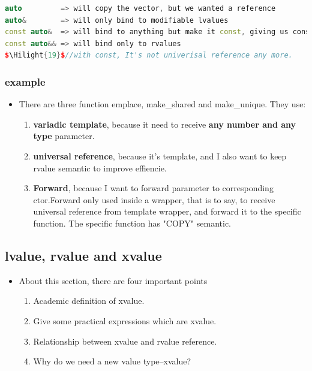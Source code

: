 \documentclass[a4paper,12pt,twoside]{book}
\newcommand{\Hilight}[1]{\makebox[0pt][l]{\color{yellow}\rule[-3pt]{#1em}{11pt}}}
\begin{document}
\begin{itemize}
\begin{enumerate}
\begin{lstlisting}[frame=single, language=c++]
auto         => will copy the vector, but we wanted a reference
auto&        => will only bind to modifiable lvalues
const auto&  => will bind to anything but make it const, giving us const_iterator
const auto&& => will bind only to rvalues
$\Hilight{19}$//with const, It's not univerisal reference any more.
\end{lstlisting} 
		\end{enumerate}

\end{itemize}

\subsubsection{example }
\begin{itemize}
\item There are three function emplace, make\_shared and make\_unique. They use:
		\begin{enumerate}
				\item \textbf{variadic template}, because it need to receive \textbf{any number and any type} parameter.
				
				\item \textbf{universal reference}, because it's template, and I also want to keep rvalue semantic to improve effiencie. 
				
				\item \textbf{Forward}, because I want to forward parameter to corresponding ctor.Forward only used inside a wrapper, that is to say, to receive universal reference from template wrapper, and forward it to the specific function. The specific function has "COPY" semantic. 
		\end{enumerate}
		
\end{itemize}

\subsection{lvalue, rvalue and xvalue}
\begin{itemize}

\item About this section, there are four important points

\begin{enumerate}
\item Academic definition of xvalue.
\item Give some practical expressions which are xvalue.
\item Relationship between xvalue and rvalue reference.
\item Why do we need a new value type--xvalue?
\end{enumerate}

\end{itemize}
\end{document}
